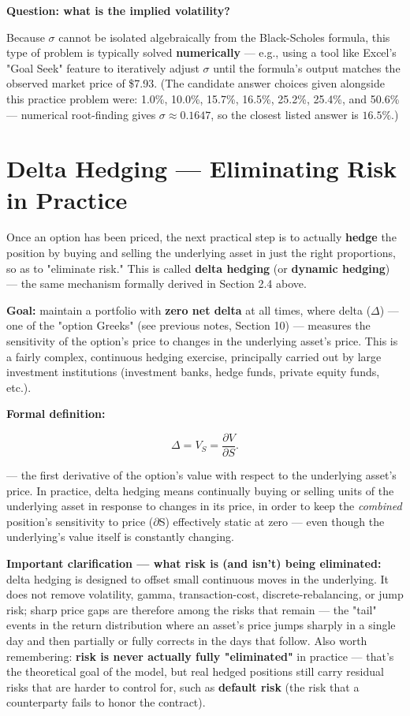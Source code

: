 \documentclass[12pt,openany]{book}
\theoremstyle{definition}
\theoremstyle{remark}
\begin{document}
\textbf{Question: what is the implied volatility?}

Because \(\sigma\) cannot be isolated algebraically from the Black-Scholes formula, this type of problem is typically solved \textbf{numerically} --- e.g., using a tool like Excel's "Goal Seek" feature to iteratively adjust \(\sigma\) until the formula's output matches the observed market price of \$7.93. (The candidate answer choices given alongside this practice problem were: 1.0\%, 10.0\%, 15.7\%, 16.5\%, 25.2\%, 25.4\%, and 50.6\% --- numerical root-finding gives \(\sigma\approx0.1647\), so the closest listed answer is \(16.5\%\).)

\section{Delta Hedging --- Eliminating Risk in Practice}

Once an option has been priced, the next practical step is to actually \textbf{hedge} the position by buying and selling the underlying asset in just the right proportions, so as to "eliminate risk." This is called \textbf{delta hedging} (or \textbf{dynamic hedging}) --- the same mechanism formally derived in Section 2.4 above.

\textbf{Goal:} maintain a portfolio with \textbf{zero net delta} at all times, where delta (\(\Delta\)) --- one of the "option Greeks" (see previous notes, Section 10) --- measures the sensitivity of the option's price to changes in the underlying asset's price. This is a fairly complex, continuous hedging exercise, principally carried out by large investment institutions (investment banks, hedge funds, private equity funds, etc.).

\textbf{Formal definition:}

\[\Delta=V_S=\frac{\partial V}{\partial S}.\]

--- the first derivative of the option's value with respect to the underlying asset's price. In practice, delta hedging means continually buying or selling units of the underlying asset in response to changes in its price, in order to keep the \emph{combined} position's sensitivity to price (\(\partial\)S) effectively static at zero --- even though the underlying's value itself is constantly changing.

\textbf{Important clarification --- what risk is (and isn't) being eliminated:} delta hedging is designed to offset small continuous moves in the underlying. It does not remove volatility, gamma, transaction-cost, discrete-rebalancing, or jump risk; sharp price gaps are therefore among the risks that remain --- the "tail" events in the return distribution where an asset's price jumps sharply in a single day and then partially or fully corrects in the days that follow. Also worth remembering: \textbf{risk is never actually fully "eliminated"} in practice --- that's the theoretical goal of the model, but real hedged positions still carry residual risks that are harder to control for, such as \textbf{default risk} (the risk that a counterparty fails to honor the contract).
\end{document}
